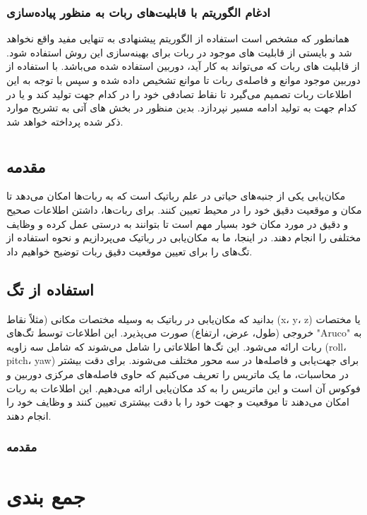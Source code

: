 \subsubsection{ادغام الگوریتم با قابلیت‌های ربات به منظور پیاده‌سازی}
همانطور که مشخص است استفاده از الگوریتم پیشنهادی به تنهایی مفید واقع نخواهد شد و بایستی از قابلیت های موجود در ربات برای بهینه‌سازی این روش استفاده شود. از قابلیت های ربات که می‌تواند به کار آید، دوربین استفاده شده می‌باشد. با استفاده از دوربین موجود موانع و فاصله‌ی ربات تا موانع تشخیص داده شده و سپس با توجه به این اطلاعات ربات تصمیم می‌گیرد تا نقاط تصادفی خود را در کدام جهت تولید کند و یا در کدام جهت به تولید ادامه مسیر نپردازد. بدین منظور در بخش های آتی به تشریح موارد ذکر شده پرداخته خواهد شد.

\newpage
\section{}

\subsection{مقدمه}

مکان‌یابی یکی از جنبه‌های حیاتی در علم رباتیک است که به ربات‌ها امکان می‌دهد تا مکان و موقعیت دقیق خود را در محیط تعیین کنند. برای ربات‌ها، داشتن اطلاعات صحیح و دقیق در مورد مکان خود بسیار مهم است تا بتوانند به درستی عمل کرده و وظایف مختلفی را انجام دهند. در اینجا، ما به مکان‌یابی در رباتیک می‌پردازیم و نحوه استفاده از تگ‌های
را برای تعیین موقعیت دقیق ربات توضیح خواهیم داد.


\subsection{استفاده از تگ}
بدانید که مکان‌یابی در رباتیک به وسیله مختصات مکانی (مثلاً نقاط (x، y، z) یا مختصات خروجی (طول، عرض، ارتفاع) صورت می‌پذیرد. این اطلاعات توسط تگ‌های "Aruco" به ربات ارائه می‌شود. این تگ‌ها اطلاعاتی را شامل می‌شوند که شامل سه زاویه (roll، pitch، yaw) برای جهت‌یابی و فاصله‌ها در سه محور مختلف می‌شوند. برای دقت بیشتر در محاسبات، ما یک ماتریس را تعریف می‌کنیم که حاوی فاصله‌های مرکزی دوربین و فوکوس آن است و این ماتریس را به کد مکان‌یابی ارائه می‌دهیم. این اطلاعات به ربات امکان می‌دهند تا موقعیت و جهت خود را با دقت بیشتری تعیین کنند و وظایف خود را انجام دهند.
\subsubsection{مقدمه}

\section{جمع بندی}

